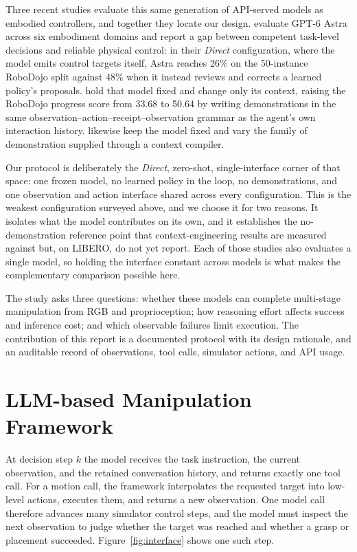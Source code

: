 \documentclass[11pt]{article}
\begin{document}
Three recent studies evaluate this same generation of API-served models as
embodied controllers, and together they locate our design.
\citet{galbot2026astra} evaluate GPT-6 Astra across six embodiment domains and
report a gap between competent task-level decisions and reliable physical
control: in their \emph{Direct} configuration, where the model emits control
targets itself, Astra reaches 26\% on the 50-instance RoboDojo split against
48\% when it instead reviews and corrects a learned policy's proposals.
\citet{roboicl2026} hold that model fixed and change only its context, raising
the RoboDojo progress score from 33.68 to 50.64 by writing demonstrations in
the same observation--action--receipt--observation grammar as the agent's own
interaction history. \citet{vlmagents2026} likewise keep the model fixed and
vary the family of demonstration supplied through a context compiler.

Our protocol is deliberately the \emph{Direct}, zero-shot, single-interface
corner of that space: one frozen model, no learned policy in the loop, no
demonstrations, and one observation and action interface shared across every
configuration. This is the weakest configuration surveyed above, and we choose
it for two reasons. It isolates what the model contributes on its own, and it
establishes the no-demonstration reference point that context-engineering
results are measured against but, on LIBERO, do not yet report. Each of those
studies also evaluates a single model, so holding the interface constant across
models is what makes the complementary comparison possible here.

The study asks three questions: whether these models can complete multi-stage
manipulation from RGB and proprioception; how reasoning effort affects success
and inference cost; and which observable failures limit execution. The
contribution of this report is a documented protocol with its design rationale,
and an auditable record of observations, tool calls, simulator actions, and API
usage.

\section{LLM-based Manipulation Framework}
\label{sec:method}
At decision step $k$ the model receives the task instruction, the current
observation, and the retained conversation history, and returns exactly one
tool call. For a motion call, the framework interpolates the requested target
into low-level actions, executes them, and returns a new observation. One model
call therefore advances many simulator control steps, and the model must
inspect the next observation to judge whether the target was reached and
whether a grasp or placement succeeded. Figure~\ref{fig:interface} shows one
such step.
\end{document}
